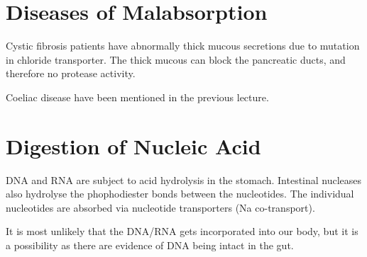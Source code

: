 \section{Diseases of Malabsorption}

Cystic fibrosis patients have abnormally thick mucous secretions due to mutation in chloride transporter.
The thick mucous can block the pancreatic ducts, and therefore no protease activity.

Coeliac disease have been mentioned in the previous lecture.

\section{Digestion of Nucleic Acid}

DNA and RNA are subject to acid hydrolysis in the stomach.
Intestinal nucleases also hydrolyse the phophodiester bonds between the nucleotides.
The individual nucleotides are absorbed via nucleotide transporters (Na co-transport).

It is most unlikely that the DNA/RNA gets incorporated into our body, but it is a possibility as there are evidence of DNA being intact in the gut.

